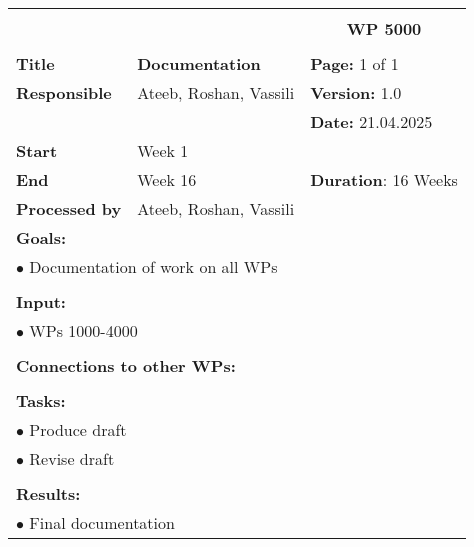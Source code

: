 \begin{table}[!h]
    \begin{center}
        \begin{tabular}{|p{}||p{}|p{}||p{}|}
            \hline
            \multicolumn{3}{|l||}{\textbf{}} & \multicolumn{1}{c|}{}\\
            \multicolumn{3}{|l||}{\textbf{}} & \multicolumn{1}{c|}{\textbf{WP 5000}}\\
            \multicolumn{3}{|l||}{\textbf{}} & \multicolumn{1}{c|}{}\\
            \hline\hline
            \textbf{Title} & \multicolumn{2}{p{.40\columnwidth}||}{\textbf{Documentation}}
            & \textbf{Page:} 1 of 1\\
            \hline
            \textbf{Responsible} & \multicolumn{2}{l||}{Ateeb, Roshan, Vassili} & \textbf{Version:} 1.0\\
            \hline
            \multicolumn{3}{|l||}{} & \textbf{Date:} 21.04.2025\\
            \hline\hline
            \textbf{Start} & \multicolumn{2}{l||}{Week 1} & \\
            \hline
            \textbf{End} & \multicolumn{2}{l||}{Week 16} & \textbf{Duration}: 16 Weeks\\
            \hline\hline
            \textbf{Processed by} & \multicolumn{3}{l|}{Ateeb, Roshan, Vassili}\\
            \hline\hline
            \multicolumn{4}{|p{.95\columnwidth}|}{\textbf{Goals:}}\\
            \multicolumn{4}{|p{.95\columnwidth}|}{$\bullet$ Documentation of work on all WPs}\\
            \multicolumn{4}{|p{.95\columnwidth}|}{}\\
            \multicolumn{4}{|p{.95\columnwidth}|}{\textbf{Input:}}\\
            \multicolumn{4}{|p{.95\columnwidth}|}{$\bullet$ WPs 1000-4000}\\
            \multicolumn{4}{|p{.95\columnwidth}|}{}\\
            \multicolumn{4}{|p{.95\columnwidth}|}{\textbf{Connections to other WPs:}}\\
            \multicolumn{4}{|p{.95\columnwidth}|}{}\\
            \multicolumn{4}{|p{.95\columnwidth}|}{\textbf{Tasks:}}\\
            \multicolumn{4}{|p{.95\columnwidth}|}{$\bullet$ Produce draft}\\
            \multicolumn{4}{|p{.95\columnwidth}|}{$\bullet$ Revise draft}\\
            \multicolumn{4}{|p{.95\columnwidth}|}{}\\
            \multicolumn{4}{|p{.95\columnwidth}|}{\textbf{Results:}}\\
            \multicolumn{4}{|p{.95\columnwidth}|}{$\bullet$ Final documentation}\\
            \hline
        \end{tabular}
    \end{center}
\end{table}

\clearpage